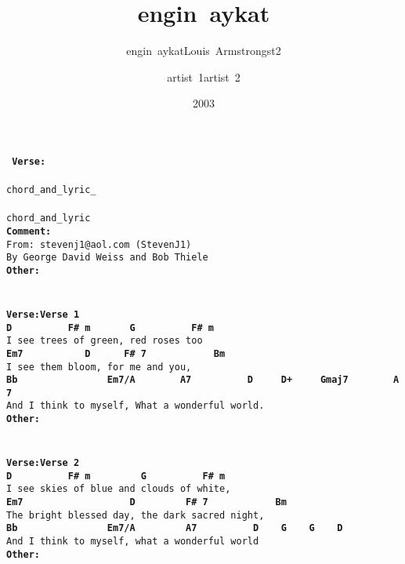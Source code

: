 \documentclass{scrartcl}
\title{engin~aykat}
\subtitle{engin~aykatLouis~Armstrongst2}\author{artist~1artist~2}
\date{2003}
\begin{document}
\maketitle
\texttt{
\textbf{Verse:} \\
\textbf{ } \\
chord\_and\_lyric\_ \\
\textbf{ } \\
chord\_and\_lyric \\
\textbf{Comment:} \\
From:~stevenj1@aol.com~(StevenJ1) \\
By~George~David~Weiss~and~Bob~Thiele \\
\textbf{Other:} \\
\textbf{ } \\
 \\
\textbf{Verse:Verse 1} \\
\textbf{ \hspace*{5em}D~~~~~~~~~~F\#~m~~~~~~~G~~~~~~~~~~F\#~m} \\
I~see~trees~of~green,~red~roses~too \\
\textbf{ Em7~~~~~~~~~~~D~~~~~~F\#~7~~~~~~~~~~~~Bm} \\
I~see~them~bloom,~for~me~and~you, \\
\textbf{ \hspace*{6em}Bb~~~~~~~~~~~~~~~~Em7/A~~~~~~~~A7~~~~~~~~~~D~~~~~D+~~~~~Gmaj7~~~~~~~~A7} \\
And~I~think~to~myself,~What~a~wonderful~world. \\
\textbf{Other:} \\
\textbf{ } \\
 \\
\textbf{Verse:Verse 2} \\
\textbf{ \hspace*{5em}D~~~~~~~~~~F\#~m~~~~~~~~~G~~~~~~~~~~F\#~m} \\
I~see~skies~of~blue~and~clouds~of~white, \\
\textbf{ Em7~~~~~~~~~~~~~~~~~~~D~~~~~~~~~F\#~7~~~~~~~~~~~~Bm} \\
The~bright~blessed~day,~the~dark~sacred~night, \\
\textbf{ \hspace*{6em}Bb~~~~~~~~~~~~~~~~Em7/A~~~~~~~~~A7~~~~~~~~~~D~~~~G~~~~G~~~~D} \\
And~I~think~to~myself,~what~a~wonderful~world \\
\textbf{Other:} \\
\textbf{ } \\
 \\
}
\end{document}

